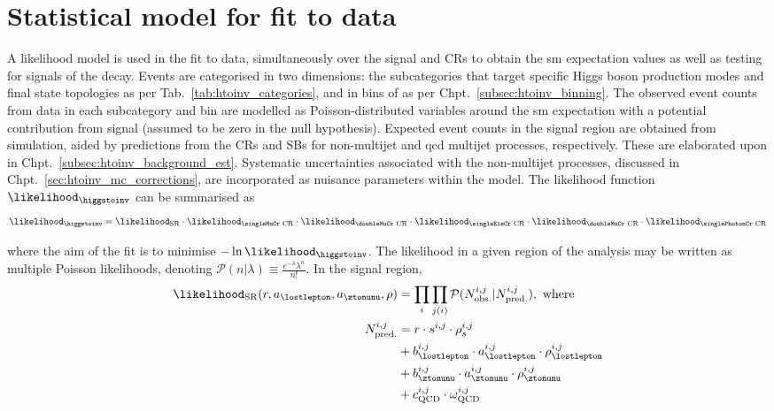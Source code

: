 \section{Statistical model for fit to data}
\label{sec:htoinv_satistical_treatment}

A likelihood model is used in the fit to data, simultaneously over the signal and \glspl{CR} to obtain the \acrlong{sm} expectation values as well as testing for signals of the \higgstoinv decay. Events are categorised in two dimensions: the subcategories that target specific Higgs boson production modes and final state topologies as per Tab.~\ref{tab:htoinv_categories}, and in bins of \ptmiss as per Chpt.~\ref{subsec:htoinv_binning}. The observed event counts from data in each subcategory and \ptmiss bin are modelled as Poisson-distributed variables around the \acrshort{sm} expectation with a potential contribution from signal (assumed to be zero in the null hypothesis). Expected event counts in the signal region are obtained from simulation, aided by predictions from the \glspl{CR} and \glspl{SB} for non-multijet and \acrshort{qcd} multijet processes, respectively. These are elaborated upon in Chpt.~\ref{subsec:htoinv_background_est}. Systematic uncertainties associated with the non-multijet processes, discussed in Chpt.~\ref{sec:htoinv_mc_corrections}, are incorporated as nuisance parameters within the model. The likelihood function $\likelihood_{\higgstoinv}$ can be summarised as
\begin{equation}
    \likelihood_{\higgstoinv} = \likelihood_{\mathrm{SR}} \cdot \likelihood_{\text{\singleMuCr CR}} \cdot \likelihood_{\text{\doubleMuCr CR}} \cdot \likelihood_{\text{\singleEleCr CR}} \cdot \likelihood_{\text{\doubleMuCr CR}} \cdot \likelihood_{\text{\singlePhotonCr CR}}
    \label{eq:likelihood_overall}
\end{equation}

where the aim of the fit is to minimise $-\ln \likelihood_{\higgstoinv}$. The likelihood in a given region of the analysis may be written as multiple Poisson likelihoods, denoting $\mathcal{P}(n | \lambda) \equiv \frac{ e^{-\lambda} \lambda^n }{n!}$. In the signal region,
\begin{equation}
    \begin{aligned}
\likelihood_{\mathrm{SR}}(r, a_{\lostlepton}, a_{\ztonunu}, \rho) &= \prod_{i} \prod_{j(i)} \mathcal{P}(N_{\mathrm{obs.}}^{i, j} | N_{\mathrm{pred.}}^{i, j}), \ \text{where}\\
N_{\mathrm{pred.}}^{i, j} &= r \cdot s^{i, j} \cdot \rho_s^{i, j}\\
&+ b_{\lostlepton}^{i, j} \cdot a_{\lostlepton}^{i, j} \cdot \rho_{\lostlepton}^{i, j}\\
&+ b_{\ztonunu}^{i, j} \cdot a_{\ztonunu}^{i, j} \cdot \rho_{\ztonunu}^{i, j}\\
&+ c_{\mathrm{QCD}}^{i, j} \cdot \omega_{\mathrm{QCD}}^{i, j}
    \end{aligned}
    \label{eq:likelihood_SR}
\end{equation}

